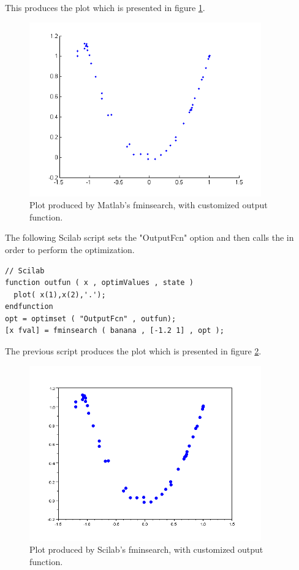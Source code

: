 This produces the plot which is presented in figure \ref{fig-fminsearch-matlab-outputfun}.

\begin{figure}
\begin{center}
\includegraphics[width=10cm]{testFminsearchPlotMatlab.png}
\end{center}
\caption{Plot produced by Matlab's fminsearch, with customized output function.}
\label{fig-fminsearch-matlab-outputfun}
\end{figure}

The following Scilab script sets the "OutputFcn" option and then calls 
the  in order to perform the optimization.

\lstset{language=scilabscript}
\begin{lstlisting}
// Scilab
function outfun ( x , optimValues , state )
  plot( x(1),x(2),'.');
endfunction
opt = optimset ( "OutputFcn" , outfun);
[x fval] = fminsearch ( banana , [-1.2 1] , opt );
\end{lstlisting}

The previous script produces the plot which is presented 
in figure \ref{fig-fminsearch-scilab-outputfun}.

\begin{figure}
\begin{center}
\includegraphics[width=10cm]{testFminsearchPlotScilab.png}
\end{center}
\caption{Plot produced by Scilab's fminsearch, with customized output function.}
\label{fig-fminsearch-scilab-outputfun}
\end{figure}

